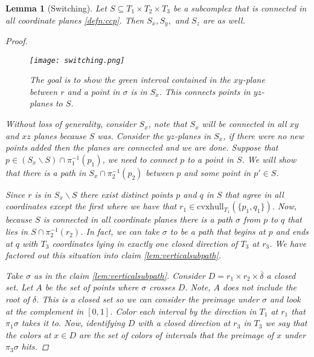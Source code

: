 \documentclass[12pt,parskip=full]{report}
\theoremstyle{plain}
\newtheorem{lem}[thm]{Lemma}
\theoremstyle{definition}
\begin{document}
\begin{lem}
    [Switching]
    \label{lem:switching} 
    Let \(S \subseteq T_1\times T_2\times T_3\) be a subcomplex that is connected in all coordinate planes \ref{defn:ccp}. Then \(S_{x}, S_{y},\) and \(S_{z}\) are as well. 
    \begin{proof}
    
    
    \begin{figure}[!h]
    \centering
    \texttt{[image: switching.png]}
    \caption{The goal is to show the green interval contained in the $xy$-plane between $r$ and a point in $\sigma$ is in $S_x$. This connects points in $yz$-planes to $S$.}
    \label{fig:square}
\end{figure}
    
        Without loss of generality, consider \(S_{ x}\), note that \(S_{x}\) will be connected in all \(xy\) and \(xz\) planes because \(S\) was. Consider the \(yz\)-planes in \(S_{x}\), if there were no new points added then the planes are connected and we are done. Suppose that \( p \in (S_{x} \smallsetminus S ) \cap \pi^{-1} _{1} (p_{1} )\), we need to connect \(p\) to a point in \(S\). We will show that there is a path in \(S_{x} \cap \pi_{2}^{-1} (p_{2} )\) between \(p\) and some point in \(p' \in S\).
       
        Since \(r\) is in \(S_x \smallsetminus S\) there exist distinct points \(p\) and \(q\) in \(S\) that agree in all coordinates except the first where we have that \(r_{1} \in \text{cvxhull}_{T_{1}}  (\{p_{1} , q_{1}\})\). Now, because \(S\) is connected in all coordinate planes there is a path \(\sigma\) from \(p\) to \(q\) that lies in \(S \cap \pi_{2}^{-1} (r_{2})\). In fact, we can take \(\sigma\) to be a path that begins at \(p\) and ends at \(q\) with \(T_{3}\) coordinates lying in exactly one closed direction of \(T_{3}\) at \(r_{3}\). We have factored out this situation into claim \ref{lem:verticalsubpath}.  

        Take \(\sigma\) as in the claim \ref{lem:verticalsubpath}. Consider \(D = r_1 \times r_{2} \times \overline \delta\) a closed set. Let \(A\) be the set of points where \(\sigma\) crosses \(D\). Note, $A$ does not include the root of $\delta$. This is a closed set so we can consider the preimage under \(\sigma\) and look at the complement in \([0,1]\). Color each interval by the direction in \(T_{1}\) at \(r_{1}\) that \(\pi_{1} \sigma\) takes it to. Now, identifying \(D\) with a closed direction at \(r_3\) in \(T_3\) we say that the colors at \(x \in D\) are the set of colors of intervals that the preimage of \(x\) under \(\pi_{3} \sigma\) hits.


\end{proof}
\end{lem}
\end{document}
